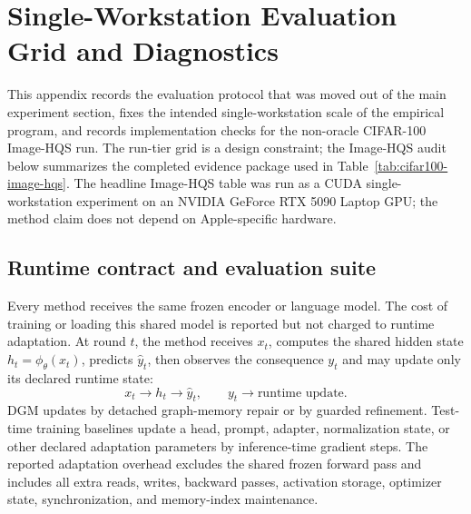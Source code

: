 \section{Single-Workstation Evaluation Grid and Diagnostics}
\label{app:additional-checks}

This appendix records the evaluation protocol that was moved out of the main
experiment section, fixes the intended single-workstation scale of the empirical
program, and records implementation checks for the non-oracle CIFAR-100
Image-HQS run. The run-tier grid is a design constraint; the Image-HQS audit
below summarizes the completed evidence package used in
Table~\ref{tab:cifar100-image-hqs}. The headline Image-HQS table was run as a
CUDA single-workstation experiment on an NVIDIA GeForce RTX 5090 Laptop GPU; the
method claim does not depend on Apple-specific hardware.

\subsection{Runtime contract and evaluation suite}

Every method receives the same frozen encoder or language model. The cost of
training or loading this shared model is reported but not charged to runtime
adaptation. At round $t$, the method receives $x_t$, computes the shared hidden
state $h_t=\phi_\theta(x_t)$, predicts $\hat y_t$, then observes the consequence
$y_t$ and may update only its declared runtime state:
\[
x_t \longrightarrow h_t \longrightarrow \hat y_t,
\qquad
y_t \longrightarrow \text{runtime update}.
\]
DGM updates by detached graph-memory repair or by guarded refinement. Test-time
training baselines update a head, prompt, adapter, normalization state, or other
declared adaptation parameters by inference-time gradient steps. The reported
adaptation overhead excludes the shared frozen forward pass and includes all
extra reads, writes, backward passes, activation storage, optimizer state,
synchronization, and memory-index maintenance.

